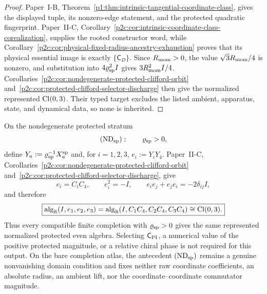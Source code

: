 \documentclass[12pt,a4paper]{article}
\begin{document}
\begin{proof}
Paper~I-B, Theorem~\ref{p1:thm:intrinsic-tangential-coordinate-class}, gives
the displayed tuple, its nonzero-edge statement, and the protected quadratic
fingerprint.  Paper~II-C,
Corollary~\ref{p2c:cor:intrinsic-coordinate-class-corealization}, supplies the
rooted constructor word, while
Corollary~\ref{p2c:cor:physical-fixed-radius-ancestry-exhaustion} proves that
its physical essential image is exactly \(\{\mathsf C_D\}\).  Since
\(R_{\mathrm{mom}}>0\), the value \(\sqrt3R_{\mathrm{mom}}/4\) is nonzero, and substitution into
\(4\varrho_{\rm sp}^{2}I\) gives \(3R_{\mathrm{mom}}^2I/4\).
Corollaries~\ref{p2c:cor:nondegenerate-protected-clifford-orbit}
and~\ref{p2c:cor:protected-clifford-selector-discharge} then give the
normalized represented \(\operatorname{Cl}(0,3)\).  Their typed target excludes the listed
ambient, apparatus, state, and dynamical data, so none is inherited.
\end{proof}

\begin{corollary}
\label{p2e:cor:protected-clifford-selector-discharge}
On the nondegenerate protected stratum
\[
 (\mathrm{ND}_{\rm sp}):\qquad \varrho_{\rm sp}>0,
\]
define \(Y_a:=\varrho_{\rm sp}^{-1}X_a^{\rm sp}\) and, for
\(i=1,2,3\), \(e_i:=Y_iY_4\).  Paper~II-C,
Corollaries~\ref{p2c:cor:nondegenerate-protected-clifford-orbit}
and~\ref{p2c:cor:protected-clifford-selector-discharge}, give
\[
 e_i=C_iC_4,\qquad
 e_i^2=-I,\qquad
 e_ie_j+e_je_i=-2\delta_{ij}I,
\]
and therefore
\[
 \boxed{\operatorname{alg}_{\mathbb R}(I,e_1,e_2,e_3)
 =\operatorname{alg}_{\mathbb R}(I,C_1C_4,C_2C_4,C_3C_4)
 \cong\operatorname{Cl}(0,3).}
\]
Thus every compatible finite completion with \(\varrho_{\rm sp}>0\) gives the
same represented normalized protected even algebra.  Selecting
\(\mathsf C_{\rm PI}\), a numerical value of the positive protected magnitude,
or a relative chiral phase is not required for this output.  On the bare
completion atlas, the antecedent \((\mathrm{ND}_{\rm sp})\) remains a genuine
nonvanishing domain condition and fixes neither raw coordinate coefficients,
an absolute radius, an ambient lift, nor the coordinate--coordinate commutator
magnitude.
\end{corollary}
\end{document}
